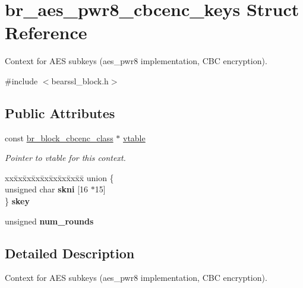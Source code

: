 \hypertarget{structbr__aes__pwr8__cbcenc__keys}{}\section{br\+\_\+aes\+\_\+pwr8\+\_\+cbcenc\+\_\+keys Struct Reference}
\label{structbr__aes__pwr8__cbcenc__keys}


Context for A\+ES subkeys ({\ttfamily aes\+\_\+pwr8} implementation, C\+BC encryption).  




{\ttfamily \#include $<$bearssl\+\_\+block.\+h$>$}

\subsection*{Public Attributes}
\begin{DoxyCompactItemize}
\item 
\mbox{\label{structbr__aes__pwr8__cbcenc__keys_a8b3fa91e685250c7a195a4d2bc488edf}} 
const \hyperlink{bearssl__block_8h_ad0ecff523e21a74dc1143dcfa52aa251}{br\+\_\+block\+\_\+cbcenc\+\_\+class} $\ast$ \hyperlink{structbr__aes__pwr8__cbcenc__keys_a8b3fa91e685250c7a195a4d2bc488edf}{vtable}
\begin{DoxyCompactList}\small\item\em Pointer to vtable for this context. \end{DoxyCompactList}\item 
\mbox{\label{structbr__aes__pwr8__cbcenc__keys_ac8e72b6a578d271fcc851ba5199bfe16}} 
\begin{tabbing}
xx\=xx\=xx\=xx\=xx\=xx\=xx\=xx\=xx\=\kill
union \{\\
\>unsigned char {\bfseries skni} \mbox{[}16 $\ast$15\mbox{]}\\
\} {\bfseries skey}\\

\end{tabbing}\item 
\mbox{\label{structbr__aes__pwr8__cbcenc__keys_a32776755b34c159e248c4210aa43699d}} 
unsigned {\bfseries num\+\_\+rounds}
\end{DoxyCompactItemize}


\subsection{Detailed Description}
Context for A\+ES subkeys ({\ttfamily aes\+\_\+pwr8} implementation, C\+BC encryption). 

